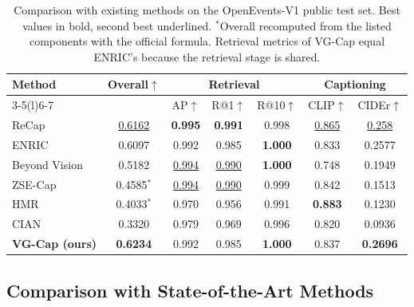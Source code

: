 \documentclass[runningheads]{llncs}
\DeclareRobustCommand{\revise}[1]{{\color{olive}#1}}
\DeclareRobustCommand{\revise}[1]{#1}
\begin{document}
\begin{table}[t]
\caption{Comparison with existing methods on the OpenEvents-V1 public test set. Best values in bold, second best underlined. $^{\ast}$Overall recomputed from the listed components with the official formula. \revise{Retrieval metrics of VG-Cap equal ENRIC's because the retrieval stage is shared.}}
\label{tab:sota}
\centering
\footnotesize
\setlength{\tabcolsep}{4pt}
\begin{tabular}{@{}l c ccc cc@{}}
\toprule
\multirow{2}{*}{\textbf{Method}} & \multirow{2}{*}{\textbf{Overall}$\uparrow$} & \multicolumn{3}{c}{\textbf{Retrieval}} & \multicolumn{2}{c}{\textbf{Captioning}} \\
\cmidrule(lr){3-5}\cmidrule(l){6-7}
 & & AP$\uparrow$ & R@1$\uparrow$ & R@10$\uparrow$ & CLIP$\uparrow$ & CIDEr$\uparrow$ \\
\midrule
ReCap~\cite{recap}                    & \underline{0.6162} & \textbf{0.995} & \textbf{0.991} & 0.998 & \underline{0.865} & \underline{0.258} \\
ENRIC~\cite{enric}                    & 0.6097 & 0.992 & 0.985 & \textbf{1.000} & 0.833 & 0.2577 \\
Beyond Vision~\cite{quy2025beyond}    & 0.5182 & \underline{0.994} & \underline{0.990} & \textbf{1.000} & 0.748 & 0.1949 \\
ZSE-Cap~\cite{dinh2025zsecap}         & 0.4585$^{\ast}$ & \underline{0.994} & \underline{0.990} & 0.999 & 0.842 & 0.1513 \\
HMR~\cite{nguyen2026hierarchical}     & 0.4033$^{\ast}$ & 0.970 & 0.956 & 0.991 & \textbf{0.883} & 0.1230 \\
CIAN~\cite{hien2026cian}              & 0.3320 & 0.979 & 0.969 & 0.996 & 0.820 & 0.0936 \\
\midrule
\textbf{VG-Cap (ours)}                & \textbf{0.6234} & 0.992 & 0.985 & \textbf{1.000} & 0.837 & \textbf{0.2696} \\
\bottomrule
\end{tabular}
\end{table}

\subsection{Comparison with State-of-the-Art Methods}
\label{sec:sota}
\end{document}
